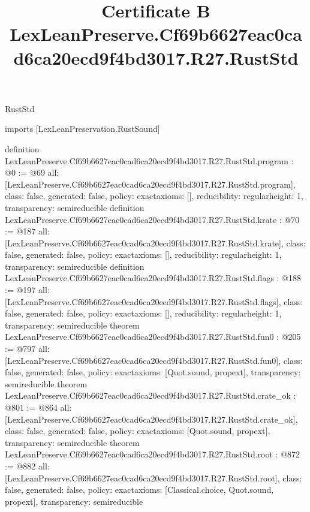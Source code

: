 \begin{lexlean}{RustStd}
\title{Certificate B LexLeanPreserve.Cf69b6627eac0cad6ca20ecd9f4bd3017.R27.RustStd}
\begin{coremodule}
imports [LexLeanPreservation.RustSound]

definition LexLeanPreserve.Cf69b6627eac0cad6ca20ecd9f4bd3017.R27.RustStd.program : @0 := @69 {
  all: [LexLeanPreserve.Cf69b6627eac0cad6ca20ecd9f4bd3017.R27.RustStd.program],
  class: false,
  generated: false,
  policy: exact{axioms: []},
  reducibility: regular{height: 1},
  transparency: semireducible
}
definition LexLeanPreserve.Cf69b6627eac0cad6ca20ecd9f4bd3017.R27.RustStd.krate : @70 := @187 {
  all: [LexLeanPreserve.Cf69b6627eac0cad6ca20ecd9f4bd3017.R27.RustStd.krate],
  class: false,
  generated: false,
  policy: exact{axioms: []},
  reducibility: regular{height: 1},
  transparency: semireducible
}
definition LexLeanPreserve.Cf69b6627eac0cad6ca20ecd9f4bd3017.R27.RustStd.flags : @188 := @197 {
  all: [LexLeanPreserve.Cf69b6627eac0cad6ca20ecd9f4bd3017.R27.RustStd.flags],
  class: false,
  generated: false,
  policy: exact{axioms: []},
  reducibility: regular{height: 1},
  transparency: semireducible
}
theorem LexLeanPreserve.Cf69b6627eac0cad6ca20ecd9f4bd3017.R27.RustStd.fun0 : @205 := @797 {
  all: [LexLeanPreserve.Cf69b6627eac0cad6ca20ecd9f4bd3017.R27.RustStd.fun0],
  class: false,
  generated: false,
  policy: exact{axioms: [Quot.sound, propext]},
  transparency: semireducible
}
theorem LexLeanPreserve.Cf69b6627eac0cad6ca20ecd9f4bd3017.R27.RustStd.crate_ok : @801 := @864 {
  all: [LexLeanPreserve.Cf69b6627eac0cad6ca20ecd9f4bd3017.R27.RustStd.crate_ok],
  class: false,
  generated: false,
  policy: exact{axioms: [Quot.sound, propext]},
  transparency: semireducible
}
theorem LexLeanPreserve.Cf69b6627eac0cad6ca20ecd9f4bd3017.R27.RustStd.root : @872 := @882 {
  all: [LexLeanPreserve.Cf69b6627eac0cad6ca20ecd9f4bd3017.R27.RustStd.root],
  class: false,
  generated: false,
  policy: exact{axioms: [Classical.choice, Quot.sound, propext]},
  transparency: semireducible
}


\end{coremodule}
\end{lexlean}
